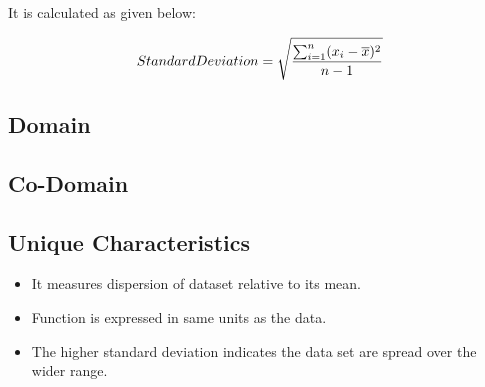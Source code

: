 \documentclass[10pt]{report}
\begin{document}
It is calculated as given below:

$$Standard Deviation = {\Large\sqrt{ \frac{\sum_{i=1}^{n}(x_i-\overline x)^2}{n-1}}}$$


\subsection{\Large \vspace{0.4 cm}Domain}

\subsection{\Large \vspace{0.4 cm}Co-Domain}
 
\subsection{\Large \vspace{0.4 cm}Unique Characteristics}
\begin{itemize}
    \item It measures dispersion of dataset relative to its mean.
    \item Function is expressed in same units as the data.
    \item The higher standard deviation indicates the data set are spread over the wider range. 
\end{itemize}
\end{document}
